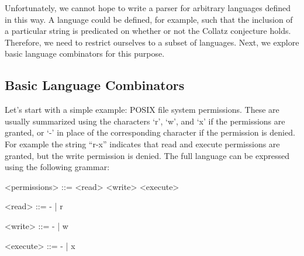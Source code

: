 Unfortunately, we cannot hope to write a parser for arbitrary languages defined in this way. A language could be defined, for example, such that the inclusion of a particular string is predicated on whether or not the Collatz conjecture holds.
Therefore, we need to restrict ourselves to a subset of languages.
Next, we explore basic language combinators for this purpose.

\subsection{Basic Language Combinators}

Let's start with a simple example: POSIX file system permissions. These are usually summarized using the characters `r', `w', and `x' if the permissions are granted, or `-' in place of the corresponding character if the permission is denied. For example the string ``r-x'' indicates that read and execute permissions are granted, but the write permission is denied. The full language can be expressed using the following grammar:

\begin{grammar}
<permissions>  ::= <read> <write> <execute>

<read>         ::= - | r

<write>        ::= - | w

<execute>      ::= - | x
\end{grammar}

\begin{code}[hide]%
%
\>[4]\AgdaSpace{}%
\AgdaSpace{}%
\AgdaSpace{}%
\AgdaSpace{}%
\AgdaSymbol{:}\AgdaSpace{}%
\<%
\end{code}

